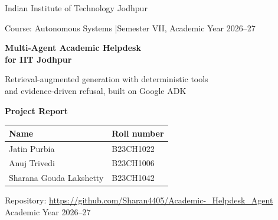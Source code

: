 \documentclass[10pt,a4paper]{article}
\begin{document}
\begin{titlepage}
\centering
\vspace*{1.2cm}
{\large Indian Institute of Technology Jodhpur\par}
{\normalsize Course: Autonomous Systems \quad|\quad Semester VII, Academic Year 2026--27\par}
\vspace{2.2cm}
{\Huge\bfseries Multi-Agent Academic Helpdesk\\[4pt] for IIT Jodhpur\par}
\vspace{0.8cm}
{\Large Retrieval-augmented generation with deterministic tools\\ and evidence-driven refusal, built on Google ADK\par}
\vspace{2.2cm}
{\Large\bfseries Project Report\par}
\vspace{1.6cm}

\begin{tabular}{@{}ll@{}}
\toprule
\textbf{Name} & \textbf{Roll number}\\
\midrule
Jatin Purbia & B23CH1022\\
Anuj Trivedi & B23CH1006\\
Sharana Gouda Lakshetty & B23CH1042\\
\bottomrule
\end{tabular}

\vspace{1.6cm}
Repository: \url{https://github.com/Sharan4405/Academic-_Helpdesk_Agent}
\vfill
{\normalsize Academic Year 2026--27}
\end{titlepage}
\end{document}
